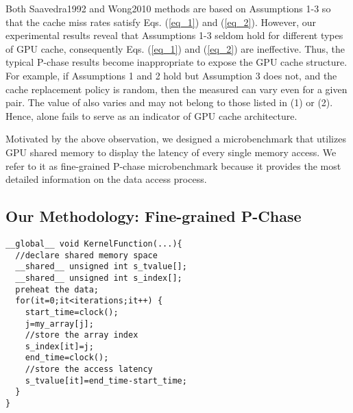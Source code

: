 \documentclass[10pt,journal,compsoc]{IEEEtran}
\theoremstyle{definition}
\begin{document}
Both Saavedra1992 and Wong2010 methods are based on Assumptions 1-3 so that the cache miss rates satisfy Eqs. (\ref{eq_1}) and (\ref{eq_2}). However, our experimental results reveal that Assumptions 1-3 seldom hold for different types of GPU cache, consequently Eqs. (\ref{eq_1}) and (\ref{eq_2}) are ineffective. Thus, the typical P-chase results become inappropriate to expose the GPU cache structure. For example, if Assumptions 1 and 2 hold but Assumption 3 does not, and the cache replacement policy is random, then the measured  can vary even for a given  pair. The value of  also varies and may not belong to those listed in (1) or (2). Hence,  alone fails to serve as an indicator of GPU cache architecture.

Motivated by the above observation, we designed a microbenchmark that utilizes GPU shared memory to display the latency of every single memory access. We refer to it as fine-grained P-chase microbenchmark because it provides the most detailed information on the data access process.

\subsection{Our Methodology: Fine-grained P-Chase}

\renewcommand{\thelstlisting}{\arabic{lstlisting}}
\begin{lstlisting}[caption={Fine-grained P-chase kernel (single thread, single CTA)}, label={list_kernelcode}]
__global__ void KernelFunction(...){
  //declare shared memory space
  __shared__ unsigned int s_tvalue[];
  __shared__ unsigned int s_index[];
  preheat the data;
  for(it=0;it<iterations;it++) {
    start_time=clock();
    j=my_array[j];
    //store the array index	
    s_index[it]=j;
    end_time=clock();
    //store the access latency
    s_tvalue[it]=end_time-start_time;
  }
}
\end{lstlisting}
\end{document}
